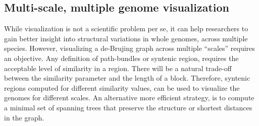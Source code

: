 
\subsection{Multi-scale, multiple genome visualization}

While visualization is not a scientific problem per se, it can help researchers to gain better insight into structural variations in whole genomes, across multiple species.
However, visualizing a de-Brujing graph across multiple ``scales'' requires an objective. Any definition of path-bundles or syntenic region, requires the acceptable level of similarity in a region. There will be a natural trade-off between the similarity parameter and the length of a block. Therefore, syntenic regions computed for different similarity values, can be used to visualize the genomes for different scales. 
An alternative more efficient strategy, is to compute a minimal set of spanning trees that preserve the structure or shortest distances in the graph.




